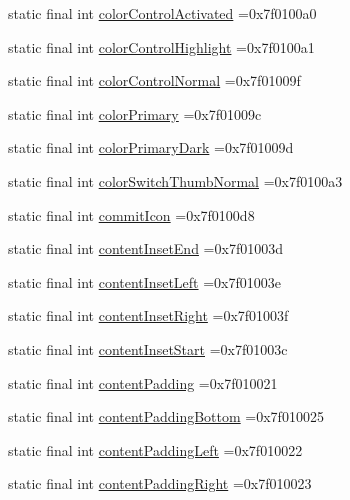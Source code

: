 \begin{DoxyCompactItemize}
\item 
static final int \hyperlink{classproject4_1_1xaria_1_1R_1_1attr_ac529c7d1311c2366a78d355bba3654a5}{color\+Control\+Activated} =0x7f0100a0
\item 
static final int \hyperlink{classproject4_1_1xaria_1_1R_1_1attr_a7164700c51b85b21d296a586de8c375c}{color\+Control\+Highlight} =0x7f0100a1
\item 
static final int \hyperlink{classproject4_1_1xaria_1_1R_1_1attr_a2f87384f7f67b60a59855f33e7d01f7d}{color\+Control\+Normal} =0x7f01009f
\item 
static final int \hyperlink{classproject4_1_1xaria_1_1R_1_1attr_ad7e37376d096d284e0265f52ca751c43}{color\+Primary} =0x7f01009c
\item 
static final int \hyperlink{classproject4_1_1xaria_1_1R_1_1attr_a54666467034380ce73718a30174be4f9}{color\+Primary\+Dark} =0x7f01009d
\item 
static final int \hyperlink{classproject4_1_1xaria_1_1R_1_1attr_a3f9187a777fa322353b2a349ee38ebb5}{color\+Switch\+Thumb\+Normal} =0x7f0100a3
\item 
static final int \hyperlink{classproject4_1_1xaria_1_1R_1_1attr_a6da99bbc7f1c0581475ea4752513ce4e}{commit\+Icon} =0x7f0100d8
\item 
static final int \hyperlink{classproject4_1_1xaria_1_1R_1_1attr_aa761e979c4ae0ddd9dff3183b7d581da}{content\+Inset\+End} =0x7f01003d
\item 
static final int \hyperlink{classproject4_1_1xaria_1_1R_1_1attr_a978554d076641b7dc7f3e6e13697e19d}{content\+Inset\+Left} =0x7f01003e
\item 
static final int \hyperlink{classproject4_1_1xaria_1_1R_1_1attr_a2b0cf22b41f484aff6c492f0bf0e3e32}{content\+Inset\+Right} =0x7f01003f
\item 
static final int \hyperlink{classproject4_1_1xaria_1_1R_1_1attr_af473293c9191579b7049ad932142e6ce}{content\+Inset\+Start} =0x7f01003c
\item 
static final int \hyperlink{classproject4_1_1xaria_1_1R_1_1attr_a565210383011ea51dc77cee55f23eb54}{content\+Padding} =0x7f010021
\item 
static final int \hyperlink{classproject4_1_1xaria_1_1R_1_1attr_a1b56a7fc87774351e61c9aaedd2953ba}{content\+Padding\+Bottom} =0x7f010025
\item 
static final int \hyperlink{classproject4_1_1xaria_1_1R_1_1attr_a4f19514e714fbb1e4c39201785a8b9c6}{content\+Padding\+Left} =0x7f010022
\item 
static final int \hyperlink{classproject4_1_1xaria_1_1R_1_1attr_ac1ee232f2551be9ac4e7e959cf91fb23}{content\+Padding\+Right} =0x7f010023

\end{DoxyCompactItemize}
